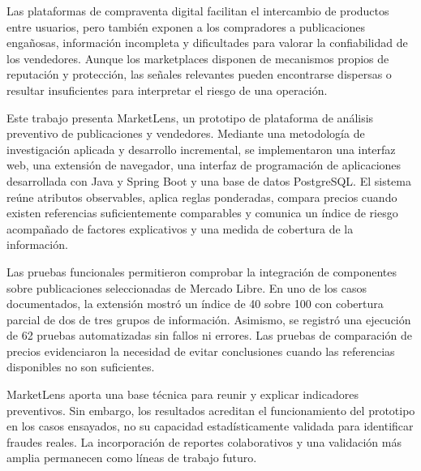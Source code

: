 
\begin{resumen}

Las plataformas de compraventa digital facilitan el intercambio de productos entre usuarios, pero también exponen a los compradores a publicaciones engañosas, información incompleta y dificultades para valorar la confiabilidad de los vendedores. Aunque los marketplaces disponen de mecanismos propios de reputación y protección, las señales relevantes pueden encontrarse dispersas o resultar insuficientes para interpretar el riesgo de una operación.

Este trabajo presenta MarketLens, un prototipo de plataforma de análisis preventivo de publicaciones y vendedores. Mediante una metodología de investigación aplicada y desarrollo incremental, se implementaron una interfaz web, una extensión de navegador, una interfaz de programación de aplicaciones desarrollada con Java y Spring Boot y una base de datos PostgreSQL. El sistema reúne atributos observables, aplica reglas ponderadas, compara precios cuando existen referencias suficientemente comparables y comunica un índice de riesgo acompañado de factores explicativos y una medida de cobertura de la información.

Las pruebas funcionales permitieron comprobar la integración de componentes sobre publicaciones seleccionadas de Mercado Libre. En uno de los casos documentados, la extensión mostró un índice de 40 sobre 100 con cobertura parcial de dos de tres grupos de información. Asimismo, se registró una ejecución de 62 pruebas automatizadas sin fallos ni errores. Las pruebas de comparación de precios evidenciaron la necesidad de evitar conclusiones cuando las referencias disponibles no son suficientes.

MarketLens aporta una base técnica para reunir y explicar indicadores preventivos. Sin embargo, los resultados acreditan el funcionamiento del prototipo en los casos ensayados, no su capacidad estadísticamente validada para identificar fraudes reales. La incorporación de reportes colaborativos y una validación más amplia permanecen como líneas de trabajo futuro.

\end{resumen}
